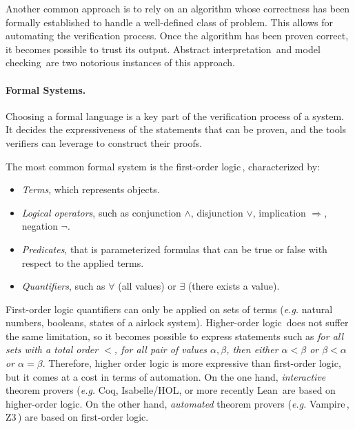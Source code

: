 Another common approach is to rely on an algorithm whose correctness has been
formally established to handle a well-defined class of problem.
%
This allows for automating the verification process.
%
Once the algorithm has been proven correct, it becomes possible to trust its
output.
%
Abstract interpretation\,\cite{cousot1977absint} and model
checking\,\cite{clarke2018modelc} are two notorious instances of this approach.

\paragraph{Formal Systems.}
%
Choosing a formal language is a key part of the verification process of a
system.
%
It decides the expressiveness of the statements that can be proven, and the
tools verifiers can leverage to construct their proofs.

The most common formal system is the first-order logic\,\cite{smullyan2012fol},
characterized by:
%
\begin{itemize}
\item \emph{Terms}, which represents objects.
\item \emph{Logical operators}, such as conjunction \( \wedge \), disjunction
  \( \vee \), implication \( \Rightarrow \), negation \( \neg \).
\item \emph{Predicates}, that is parameterized formulas that can be true or
  false with respect to the applied terms.
\item \emph{Quantifiers}, such as \( \forall \) (all values) or \( \exists \)
  (there exists a value).
\end{itemize}

First-order logic quantifiers can only be applied on sets of terms (\emph{e.g.}
natural numbers, booleans, states of a airlock system).
%
Higher-order logic\,\cite{leivant1994hol} does not suffer the same limitation,
so it becomes possible to express statements such as \emph{for all sets with a
  total order \( < \), for all pair of values \( \alpha, \beta \), then either
  \( \alpha < \beta \) or \( \beta < \alpha \) or \( \alpha = \beta \)}.
%
Therefore, higher order logic is more expressive than first-order logic, but
it comes at a cost in terms of automation.
%
On the one hand, \emph{interactive} theorem provers (\emph{e.g.}  Coq,
Isabelle/HOL, or more recently Lean\,\cite{de2015lean} are based on higher-order
logic.
%
On the other hand, \emph{automated} theorem provers (\emph{e.g.}
Vampire\,\cite{riazanov2002vampire}, Z3\,\cite{de2008z3}) are based on
first-order logic.

